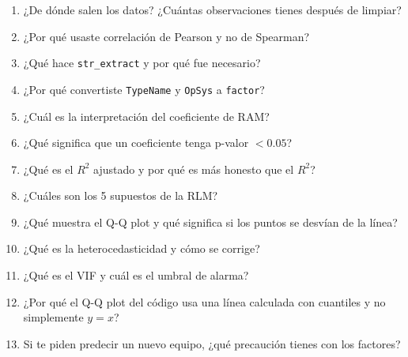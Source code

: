\documentclass[12pt,a4paper]{article}
\begin{document}
\begin{enumerate}
    \item ¿De dónde salen los datos? ¿Cuántas observaciones tienes después de limpiar?
    \item ¿Por qué usaste correlación de Pearson y no de Spearman?
    \item ¿Qué hace \texttt{str\_extract} y por qué fue necesario?
    \item ¿Por qué convertiste \texttt{TypeName} y \texttt{OpSys} a \texttt{factor}?
    \item ¿Cuál es la interpretación del coeficiente de RAM?
    \item ¿Qué significa que un coeficiente tenga p-valor $< 0.05$?
    \item ¿Qué es el $R^2$ ajustado y por qué es más honesto que el $R^2$?
    \item ¿Cuáles son los 5 supuestos de la RLM?
    \item ¿Qué muestra el Q-Q plot y qué significa si los puntos se desvían de la línea?
    \item ¿Qué es la heterocedasticidad y cómo se corrige?
    \item ¿Qué es el VIF y cuál es el umbral de alarma?
    \item ¿Por qué el Q-Q plot del código usa una línea calculada con cuantiles y no simplemente $y=x$?
    \item Si te piden predecir un nuevo equipo, ¿qué precaución tienes con los factores?
\end{enumerate}

\end{document}

